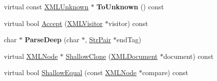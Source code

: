 \begin{DoxyCompactItemize}
\mbox{\label{classtinyxml2_1_1XMLUnknown_a61b342b4f295cded1dc2f4402e97f07e}} 
virtual const \hyperlink{classtinyxml2_1_1XMLUnknown}{X\+M\+L\+Unknown} $\ast$ {\bfseries To\+Unknown} () const
\item 
virtual bool \hyperlink{classtinyxml2_1_1XMLUnknown_a70983aa1b1cff3d3aa6d4d0a80e5ee48}{Accept} (\hyperlink{classtinyxml2_1_1XMLVisitor}{X\+M\+L\+Visitor} $\ast$visitor) const
\item 
\mbox{\label{classtinyxml2_1_1XMLUnknown_aa2d7b6bce2e6299247f5b83873ff215d}} 
char $\ast$ {\bfseries Parse\+Deep} (char $\ast$, \hyperlink{classtinyxml2_1_1StrPair}{Str\+Pair} $\ast$end\+Tag)
\item 
virtual \hyperlink{classtinyxml2_1_1XMLNode}{X\+M\+L\+Node} $\ast$ \hyperlink{classtinyxml2_1_1XMLUnknown_a0125f41c89763dea06619b5fd5246b4c}{Shallow\+Clone} (\hyperlink{classtinyxml2_1_1XMLDocument}{X\+M\+L\+Document} $\ast$document) const
\item 
virtual bool \hyperlink{classtinyxml2_1_1XMLUnknown_a0715ab2c05d7f74845c188122213b116}{Shallow\+Equal} (const \hyperlink{classtinyxml2_1_1XMLNode}{X\+M\+L\+Node} $\ast$compare) const
\end{DoxyCompactItemize}

